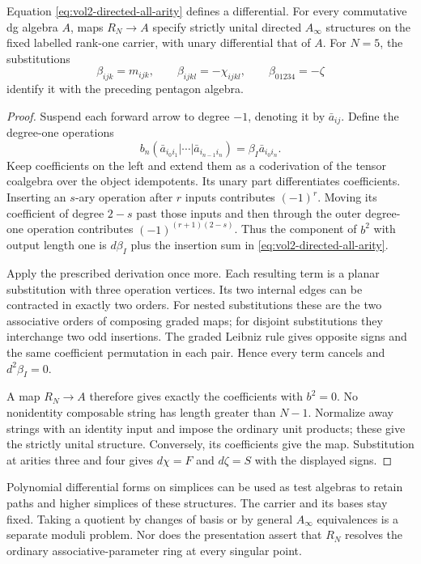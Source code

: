 \begin{theorem}\label{thm:vol2-directed-all-arity}
Equation \eqref{eq:vol2-directed-all-arity} defines a
differential. For every commutative dg algebra $A$, maps
$R_N\to A$ specify strictly unital directed $A_\infty$
structures on the fixed labelled rank-one carrier, with
unary differential that of $A$. For $N=5$, the substitutions
\[
 \beta_{ijk}=m_{ijk},\qquad
 \beta_{ijkl}=-\chi_{ijkl},\qquad
 \beta_{01234}=-\zeta
\]
identify it with the preceding pentagon algebra.
\end{theorem}

\begin{proof}
Suspend each forward arrow to degree $-1$, denoting it by
$\bar a_{ij}$. Define the degree-one operations
\[
 b_n(\bar a_{i_0i_1}|\cdots|\bar a_{i_{n-1}i_n})
                  =\beta_I\bar a_{i_0i_n}.
\]
Keep coefficients on the left and extend them as a
coderivation of the tensor coalgebra over the object
idempotents. Its unary part differentiates coefficients.
Inserting an $s$-ary operation after $r$ inputs contributes
$(-1)^r$. Moving its coefficient of degree $2-s$ past those
inputs and then through the outer degree-one operation
contributes $(-1)^{(r+1)(2-s)}$. Thus the component of
$b^2$ with output length one is $d\beta_I$ plus the
insertion sum in \eqref{eq:vol2-directed-all-arity}.

Apply the prescribed derivation once more. Each resulting
term is a planar substitution with three operation vertices.
Its two internal edges can be contracted in exactly two
orders. For nested substitutions these are the two
associative orders of composing graded maps; for disjoint
substitutions they interchange two odd insertions. The
graded Leibniz rule gives opposite signs and the same
coefficient permutation in each pair. Hence every term
cancels and $d^2\beta_I=0$.

A map $R_N\to A$ therefore gives exactly the coefficients
with $b^2=0$. No nonidentity composable string has length
greater than $N-1$. Normalize away strings with an identity
input and impose the ordinary unit products; these give
the strictly unital structure. Conversely, its coefficients
give the map. Substitution at arities three and four gives
$d\chi=F$ and $d\zeta=S$ with the displayed signs.
\end{proof}

Polynomial differential forms on simplices can be used as
test algebras to retain paths and higher simplices of these
structures. The carrier and its bases stay fixed. Taking
a quotient by changes of basis or by general $A_\infty$
equivalences is a separate moduli problem. Nor does the
presentation assert that $R_N$ resolves the ordinary
associative-parameter ring at every singular point.

